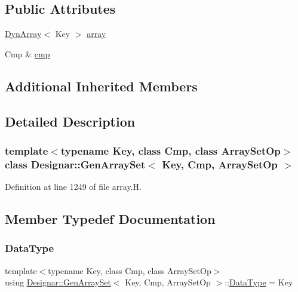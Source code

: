 \subsection*{Public Attributes}
\begin{DoxyCompactItemize}
\item 
\hyperlink{class_designar_1_1_dyn_array}{Dyn\+Array}$<$ Key $>$ \hyperlink{class_designar_1_1_gen_array_set_a8118f689e762c993ed0ba7394a8f480a}{array}
\item 
Cmp \& \hyperlink{class_designar_1_1_gen_array_set_a2b1e3c653865a794eab7d19e43c1b0de}{cmp}
\end{DoxyCompactItemize}
\subsection*{Additional Inherited Members}


\subsection{Detailed Description}
\subsubsection*{template$<$typename Key, class Cmp, class Array\+Set\+Op$>$\newline
class Designar\+::\+Gen\+Array\+Set$<$ Key, Cmp, Array\+Set\+Op $>$}



Definition at line 1249 of file array.\+H.



\subsection{Member Typedef Documentation}
\mbox{\label{class_designar_1_1_gen_array_set_ac69f0c0b76358cd5effd2dc05bd724ee}} 
\subsubsection{\texorpdfstring{Data\+Type}{DataType}}
{\footnotesize\ttfamily template$<$typename Key, class Cmp, class Array\+Set\+Op$>$ \\
using \hyperlink{class_designar_1_1_gen_array_set}{Designar\+::\+Gen\+Array\+Set}$<$ Key, Cmp, Array\+Set\+Op $>$\+::\hyperlink{class_designar_1_1_gen_array_set_ac69f0c0b76358cd5effd2dc05bd724ee}{Data\+Type} =  Key}



